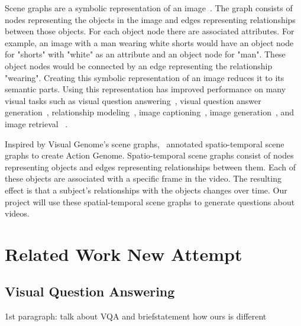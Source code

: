 \documentclass[10pt,twocolumn,letterpaper]{article}
\newcommand{\mgm}[1]{{\color{cyan}{mgm: #1}}}
\begin{document}
Scene graphs are a symbolic representation of an image~\cite{krishna2017visual}. The graph consists of nodes representing the objects in the image and edges representing relationships between those objects. For each object node there are associated attributes. For example, an image with a man wearing white shorts would have an object node for "shorts" with "white" as an attribute and an object node for "man". These object nodes would be connected by an edge representing the relationship "wearing". Creating this symbolic representation of an image reduces it to its semantic parts. Using this representation has improved performance on many visual tasks such as visual question answering~\cite{johnson2017inferring}, visual question answer generation~\cite{hudson2019gqa}, relationship modeling~\cite{krishna2018referring}, image captioning~\cite{anderson2016spice}, image generation~\cite{johnson2018image,ashual2019specifying}, and image retrieval ~\cite{ashual2019specifying,johnson2015image}.

Inspired by Visual Genome's scene graphs,~\cite{ji2020action} annotated spatio-temporal scene graphs to create Action Genome. Spatio-temporal scene graphs consist of nodes representing objects and edges representing relationships between them. Each of these objects are associated with a specific frame in the video. The resulting effect is that a subject's relationships with the objects changes over time. Our project will use these spatial-temporal scene graphs to generate questions about videos. \mgm{Does the strcuturing of related work sections matter? this seems like an anti-climatic one to end on}

\mgm{Related work generally: I'm not sure how relevant all the parts are. CLEVR talks about how it balances answers and b/c its synthetic can do more in depth reasoning abilities. GQA talks about balancing answers and how CLEVR is synthetic, and other synthetic question generation methods. So i think focusing more of this section on the previous balancing attempts would help. I'm not sure how important the distinction between ImageQA and VideoQA is. Also neither of them split up the Related work into subsections.}

\section{Related Work New Attempt}

\subsection{Visual Question Answering}
1st paragraph: talk about VQA and briefstatement how ours is different
\end{document}
